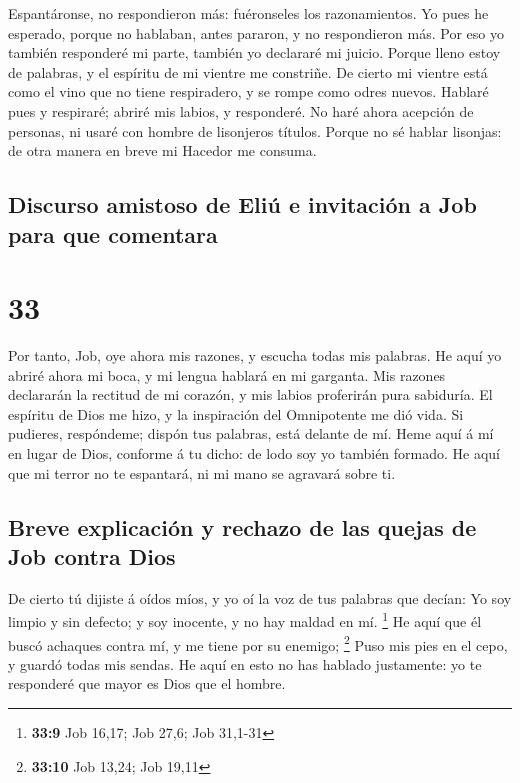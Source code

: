  Espantáronse, no respondieron más: fuéronseles los
razonamientos.  Yo pues he esperado, porque no hablaban,
antes pararon, y no respondieron más.  Por eso yo también
responderé mi parte, también yo declararé mi juicio. 
Porque lleno estoy de palabras, y el espíritu de mi vientre me
constriñe.  De cierto mi vientre está como el vino que no
tiene respiradero, y se rompe como odres nuevos.  Hablaré
pues y respiraré; abriré mis labios, y responderé.  No
haré ahora acepción de personas, ni usaré con hombre de lisonjeros
títulos.  Porque no sé hablar lisonjas: de otra manera en
breve mi Hacedor me consuma.

\hypertarget{discurso-amistoso-de-eliuxfa-e-invitaciuxf3n-a-job-para-que-comentara}{%
\subsection{Discurso amistoso de Eliú e invitación a Job para que
comentara}\label{discurso-amistoso-de-eliuxfa-e-invitaciuxf3n-a-job-para-que-comentara}}

\hypertarget{section-32}{%
\section{33}\label{section-32}}

 Por tanto, Job, oye ahora mis razones, y escucha todas
mis palabras.  He aquí yo abriré ahora mi boca, y mi
lengua hablará en mi garganta.  Mis razones declararán la
rectitud de mi corazón, y mis labios proferirán pura sabiduría.
 El espíritu de Dios me hizo, y la inspiración del
Omnipotente me dió vida.  Si pudieres, respóndeme; dispón
tus palabras, está delante de mí.  Heme aquí á mí en lugar
de Dios, conforme á tu dicho: de lodo soy yo también formado.
 He aquí que mi terror no te espantará, ni mi mano se
agravará sobre ti.

\hypertarget{breve-explicaciuxf3n-y-rechazo-de-las-quejas-de-job-contra-dios}{%
\subsection{Breve explicación y rechazo de las quejas de Job contra
Dios}\label{breve-explicaciuxf3n-y-rechazo-de-las-quejas-de-job-contra-dios}}

 De cierto tú dijiste á oídos míos, y yo oí la voz de tus
palabras que decían:  Yo soy limpio y sin defecto; y soy
inocente, y no hay maldad en mí. \footnote{\textbf{33:9} Job 16,17; Job
  27,6; Job 31,1-31}  He aquí que él buscó achaques
contra mí, y me tiene por su enemigo; \footnote{\textbf{33:10} Job
  13,24; Job 19,11}  Puso mis pies en el cepo, y guardó
todas mis sendas.  He aquí en esto no has hablado
justamente: yo te responderé que mayor es Dios que el hombre.

